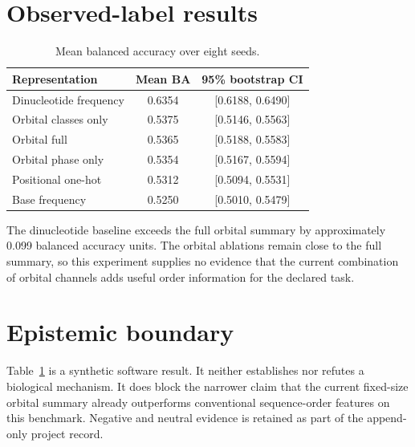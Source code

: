 \documentclass[11pt]{article}
\begin{document}
\section{Observed-label results}
\begin{table}[ht]
\centering
\caption{Mean balanced accuracy over eight seeds.}
\label{tab:results}
\begin{tabular}{lcc}
\toprule
Representation & Mean BA & 95\% bootstrap CI \\
\midrule
Dinucleotide frequency & 0.6354 & [0.6188, 0.6490] \\
Orbital classes only & 0.5375 & [0.5146, 0.5563] \\
Orbital full & 0.5365 & [0.5188, 0.5583] \\
Orbital phase only & 0.5354 & [0.5167, 0.5594] \\
Positional one-hot & 0.5312 & [0.5094, 0.5531] \\
Base frequency & 0.5250 & [0.5010, 0.5479] \\
\bottomrule
\end{tabular}
\end{table}

The dinucleotide baseline exceeds the full orbital summary by approximately
0.099 balanced accuracy units.  The orbital ablations remain close to the full
summary, so this experiment supplies no evidence that the current combination
of orbital channels adds useful order information for the declared task.

\section{Epistemic boundary}
Table~\ref{tab:results} is a synthetic software result.  It neither establishes
nor refutes a biological mechanism.  It does block the narrower claim that the
current fixed-size orbital summary already outperforms conventional
sequence-order features on this benchmark.  Negative and neutral evidence is
retained as part of the append-only project record.
\end{document}
